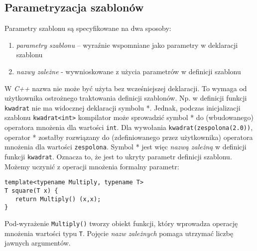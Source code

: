 \documentclass[11pt, a4paper]{article}
\begin{document}
\lstset{language=C++}

\subsection{Parametryzacja szablonów}

Parametry szablonu są specyfikowane na dwa sposoby:

\begin{enumerate}

\item \emph{parametry szablonu} – wyraźnie wspomniane jako parametry w deklaracji szablonu

\item \emph{nazwy zależne} - wywnioskowane z użycia parametrów w definicji szablonu

\end{enumerate}

W \emph{C++} nazwa nie może być użyta bez wcześniejszej deklaracji. To wymaga od użytkownika ostrożnego traktowania definicji szablonów. Np. w definicji funkcji \verb#kwadrat# nie ma widocznej deklaracji symbolu *. Jednak, podczas inicjalizacji szablonu \verb#kwadrat<int># kompilator może sprowadzić symbol * do (wbudowanego) operatora mnożenia dla wartości \verb#int#. Dla wywołania \verb#kwadrat(zespolona(2.0))#, operator * zostałby rozwiązany do (zdefiniowanego przez użytkownika) operatora mnożenia dla wartości \verb#zespolona#. Symbol * jest więc \emph{nazwą zależną} w definicji funkcji \verb#kwadrat#. Oznacza to, że jest to ukryty parametr definicji szablonu. Możemy uczynić z operacji mnożenia formalny parametr:

\begin{lstlisting}[frame=single]
template<typename Multiply, typename T>
T square(T x) {
   return Multiply() (x,x);
}
\end{lstlisting}

Pod-wyrażenie \verb#Multiply()# tworzy obiekt funkcji, który wprowadza operację mnożenia wartości typu \verb#T#. Pojęcie \emph{nazw zależnych} pomaga utrzymać liczbę jawnych argumentów.
\end{document}
